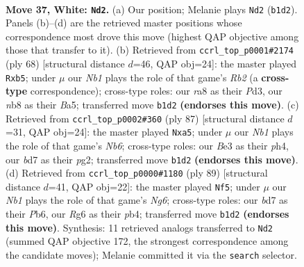 \documentclass[11pt]{article}
\begin{document}
\clearpage

\begin{figure}[p]\centering
\begin{subfigure}{0.46\textwidth}\centering
\resizebox{\linewidth}{!}{%
\newchessgame
\chessboard[
  setfen={rn6/3bk3/6R1/3p4/1p6/pP2B3/P1P3PK/RN6 w - - 3 37},
  showmover=false,
  pgfstyle=straightmove, color=movearrow, markmove={b1-d2}
]}
\caption{}
\end{subfigure}\hfill
\begin{subfigure}{0.46\textwidth}\centering
\resizebox{\linewidth}{!}{%
\newchessgame
\chessboard[
  setfen={2r5/8/3k1p2/Bp1bp2r/7p/3P1P1P/1R4P1/4R2K w - - 0 35},
  showmover=false,
  pgfstyle=straightmove, color=movearrow, markmove={b2-b5}
]}
\caption{}
\end{subfigure}
\\[4pt]
\begin{subfigure}{0.46\textwidth}\centering
\resizebox{\linewidth}{!}{%
\newchessgame
\chessboard[
  setfen={2N5/1r3pk1/p5p1/P2P3p/2R4P/1n3P2/6P1/6K1 b - - 0 44},
  showmover=false,
  pgfstyle=straightmove, color=movearrow, markmove={b3-a5}
]}
\caption{}
\end{subfigure}\hfill
\begin{subfigure}{0.46\textwidth}\centering
\resizebox{\linewidth}{!}{%
\newchessgame
\chessboard[
  setfen={8/p5rp/Ppp2k2/7P/1P3N2/6n1/1KP2R2/8 b - - 2 45},
  showmover=false,
  pgfstyle=straightmove, color=movearrow, markmove={g3-f5}
]}
\caption{}
\end{subfigure}
\caption{\textbf{Move 37, White: \texttt{Nd2}.} (a) Our position; Melanie plays \texttt{Nd2} (\texttt{b1d2}). Panels (b)--(d) are the retrieved master positions whose correspondence most drove this move (highest QAP objective among those that transfer to it). (b) Retrieved from \texttt{ccrl\_top\_p0001\#2174} (ply 68) [structural distance $d$=46, QAP obj=24]: the master played \texttt{Rxb5}; under $\mu$ our \emph{Nb1} plays the role of that game's \emph{Rb2} (a \textbf{cross-type} correspondence); cross-type roles: our \emph{r}a8 as their \emph{P}d3, our \emph{n}b8 as their \emph{B}a5; transferred move \texttt{b1d2} \textbf{(endorses this move)}. (c) Retrieved from \texttt{ccrl\_top\_p0002\#360} (ply 87) [structural distance $d$=31, QAP obj=24]: the master played \texttt{Nxa5}; under $\mu$ our \emph{Nb1} plays the role of that game's \emph{Nb6}; cross-type roles: our \emph{B}e3 as their \emph{p}h4, our \emph{b}d7 as their \emph{p}g2; transferred move \texttt{b1d2} \textbf{(endorses this move)}. (d) Retrieved from \texttt{ccrl\_top\_p0000\#1180} (ply 89) [structural distance $d$=41, QAP obj=22]: the master played \texttt{Nf5}; under $\mu$ our \emph{Nb1} plays the role of that game's \emph{Ng6}; cross-type roles: our \emph{b}d7 as their \emph{P}b6, our \emph{R}g6 as their \emph{p}b4; transferred move \texttt{b1d2} \textbf{(endorses this move)}. Synthesis: 11 retrieved analogs transferred to \texttt{Nd2} (summed QAP objective 172, the strongest correspondence among the candidate moves); Melanie committed it via the \texttt{search} selector.}
\label{fig:thought-m72}
\end{figure}
\end{document}

